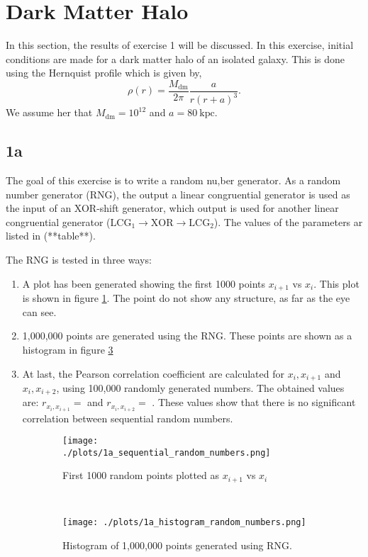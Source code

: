 
\section{Dark Matter Halo}
In this section, the results of exercise 1 will be discussed. In this exercise, initial conditions are made for a dark matter halo of an isolated galaxy. This is done using the Hernquist profile which is given by,
\begin{equation}\label{eq:her}
  \rho(r) = \frac{M_\mathrm{dm}}{2\pi}\frac{a}{r(r+a)^3}.
\end{equation}
We assume her that $M_\mathrm{dm} = 10^{12}$ and $a=80\ \mathrm{kpc}$.

\subsection*{1a}\label{sec:1a}
The goal of this exercise is to write a random nu,ber generator. As a random number generator (RNG), the output a linear congruential generator is used as the input of an XOR-shift generator, which output is used for another linear congruential generator ($\mathrm{LCG}_1 \rightarrow \mathrm{XOR} \rightarrow \mathrm{LCG}_2$). The values of the parameters ar listed in (**table**). 

The RNG is tested in three ways:
\begin{enumerate}
  \item A plot has been generated showing the first 1000 points $x_{i+1}$ vs $x_i$. This plot is shown in figure \ref{fig:1a1}. The point do not show any structure, as far as the eye can see.
  \item 1,000,000 points are generated using the RNG. These points are shown as a histogram in figure \ref{fig:1a2}
  \item At last, the Pearson correlation coefficient are calculated for $x_i,x_{i+1}$ and $x_i, x_{i+2}$, using 100,000 randomly generated numbers. The obtained values are: $r_{x_i,x_{i+1}} = $  and $r_{x_i,x_{i+2}} = $ . These values show that there is no significant correlation between sequential random numbers.
\end{enumerate}

\begin{figure}[h]
  \centering
  \begin{subfigure}[b]{0.49\textwidth}
    
    \texttt{[image: ./plots/1a\_sequential\_random\_numbers.png]}
    \caption{First 1000 random points plotted as $x_{i+1}$ vs $x_i$}
    \label{fig:1a1}
  \end{subfigure}
  ~
  \begin{subfigure}[b]{0.49\textwidth}
    \texttt{[image: ./plots/1a\_histogram\_random\_numbers.png]}
    \caption{Histogram of 1,000,000 points generated using RNG.}
    \label{fig:1a2}
  \end{subfigure}
  \caption{}
\end{figure}



